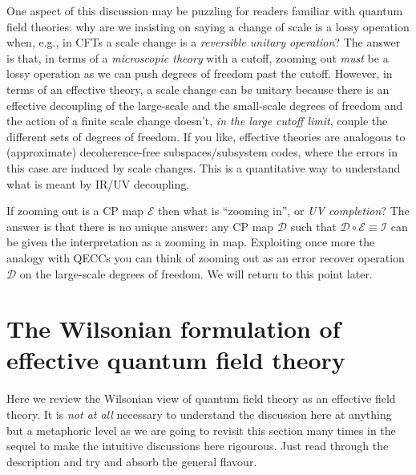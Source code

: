 \documentclass[11pt]{amsart}
\theoremstyle{plain}%
\theoremstyle{definition}
\theoremstyle{remark}
\begin{document}
One aspect of this discussion may be puzzling for readers familiar with quantum field theories: why are we insisting on saying a change of scale is a lossy operation when, e.g., in CFTs a scale change is a \emph{reversible unitary operation}? The answer is that, in terms of a \emph{microscopic theory} with a cutoff, zooming out \emph{must} be a lossy operation as we can push degrees of freedom past the cutoff. However, in terms of an effective theory, a scale change can be unitary because there is an effective decoupling of the large-scale  and the small-scale degrees of freedom and the action of a finite scale change doesn't, \emph{in the large cutoff limit}, couple the different sets of degrees of freedom. If you like, effective theories are analogous to (approximate) decoherence-free subspaces/subsystem codes, where the errors in this case are induced by scale changes. This is a quantitative way to understand what is meant by IR/UV decoupling.

If zooming out is a CP map $\mathcal{E}$ then what is ``zooming in'', or \emph{UV completion}? The answer is that there is no unique answer: any CP map $\mathcal{D}$ such that $\mathcal{D}\circ \mathcal{E} \equiv \mathcal{I}$ can be given the interpretation as a zooming in map. Exploiting once more the analogy with QECCs you can think of zooming out as an error recover operation $\mathcal{D}$ on the large-scale degrees of freedom. We will return to this point later.


\section{The Wilsonian formulation of effective quantum field theory}\label{sec:wilson}
Here we review the Wilsonian view of quantum field theory as an effective field theory. It is \emph{not at all} necessary to understand the discussion here at anything but a metaphoric level as we are going to revisit this section many times in the sequel to make the intuitive discussions here rigourous. Just read through the description and try and absorb the general flavour. 
\end{document}
